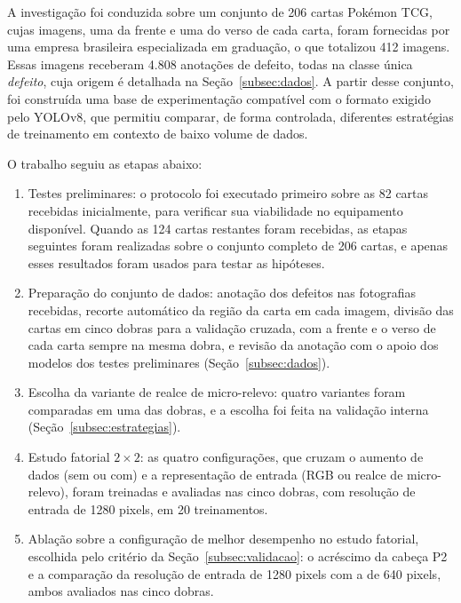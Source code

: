 \documentclass[
    12pt,                %
    openright,           %
    oneside,             %
    a4paper,             %
    english,             %
    brazil               %
]{abntex2}
\begin{document}
A investigação foi conduzida sobre um conjunto de 206 cartas Pokémon
TCG, cujas imagens, uma da frente e uma do verso de cada carta, foram
fornecidas por uma empresa brasileira especializada em graduação, o que
totalizou 412 imagens. Essas imagens receberam 4.808 anotações de
defeito, todas na classe única \textit{defeito}, cuja origem é
detalhada na Seção~\ref{subsec:dados}. A partir desse conjunto, foi
construída uma base de experimentação compatível com o formato exigido
pelo YOLOv8, que permitiu comparar, de forma controlada, diferentes
estratégias de treinamento em contexto de baixo volume de dados.

O trabalho seguiu as etapas abaixo:

\begin{enumerate}
    \item Testes preliminares: o protocolo foi executado primeiro sobre
    as 82 cartas recebidas inicialmente, para verificar sua viabilidade
    no equipamento disponível. Quando as 124 cartas restantes foram
    recebidas, as etapas seguintes foram realizadas sobre o conjunto
    completo de 206 cartas, e apenas esses resultados foram usados para
    testar as hipóteses.

    \item Preparação do conjunto de dados: anotação dos defeitos nas
    fotografias recebidas, recorte automático da região da carta em cada
    imagem, divisão das cartas em cinco dobras para a validação cruzada,
    com a frente e o verso de cada carta sempre na mesma dobra, e revisão
    da anotação com o apoio dos modelos dos testes preliminares
    (Seção~\ref{subsec:dados}).

    \item Escolha da variante de realce de micro-relevo: quatro
    variantes foram comparadas em uma das dobras, e a escolha foi feita
    na validação interna (Seção~\ref{subsec:estrategias}).

    \item Estudo fatorial $2 \times 2$: as quatro configurações, que
    cruzam o aumento de dados (sem ou com) e a representação de entrada
    (RGB ou realce de micro-relevo), foram treinadas e avaliadas nas
    cinco dobras, com resolução de entrada de 1280 pixels, em 20
    treinamentos.

    \item Ablação sobre a configuração de melhor desempenho no estudo
    fatorial, escolhida pelo critério da Seção~\ref{subsec:validacao}:
    o acréscimo da cabeça P2 e a comparação da resolução de entrada de
    1280 pixels com a de 640 pixels, ambos avaliados nas cinco dobras.


\end{enumerate}
\end{document}
